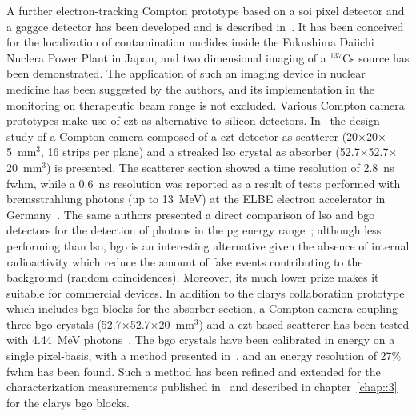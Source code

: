 A further electron-tracking Compton prototype based on a \gls{soi} pixel detector and a \gls{gaggce} detector has been developed and is described in~\cite{Yoshihara2017}. It has been conceived for the localization of contamination nuclides inside the Fukushima Daiichi Nuclera Power Plant in Japan, and two dimensional imaging of a $^137$Cs source has been demonstrated. The application of such an imaging device in nuclear medicine has been suggested by the authors, and its implementation in the monitoring on therapeutic beam range is not excluded. 
Various Compton camera prototypes make use of \gls{czt} as alternative to silicon detectors. In~\cite{Kormoll2011} the design study of a Compton camera composed of a \gls{czt} detector as scatterer (20$\times$20$\times$5~mm$^3$, 16 strips per plane) and a streaked \gls{lso} crystal as absorber (52.7$\times$52.7$\times$20~mm$^3$) is presented. The scatterer section showed a time resolution of 2.8~ns \gls{fwhm}, while a 0.6~ns resolution was reported as a result of tests performed with bremsstrahlung photons (up to 13~MeV) at the ELBE electron accelerator in Germany~\parencite{HuesoGonzalez2014}. The same authors presented a direct comparison of \gls{lso} and \gls{bgo} detectors for the detection of photons in the \gls{pg} energy range~\parencite{HuesoGonzalez2015}; although less performing than \gls{lso}, \gls{bgo} is an interesting alternative given the absence of internal radioactivity which reduce the amount of fake events contributing to the background (random coincidences). Moreover, its much lower prize makes it suitable for commercial devices. 
In addition to the \gls{clarys} collaboration prototype which includes \gls{bgo} blocks for the absorber section, a Compton camera coupling three \gls{bgo} crystals (52.7$\times$52.7$\times$20~mm$^3$) and a \gls{czt}-based scatterer has been tested with 4.44~MeV photons~\parencite{Golnik2016}. The \gls{bgo} crystals have been calibrated in energy on a single pixel-basis, with a method presented in~\parencite{HuesoGonzalez2015}, and an energy resolution of 27\% \gls{fwhm} has been found. 
Such a method has been refined and extended for the characterization measurements published in~\parencite{Fontana2018} and described in chapter~\ref{chap::3} for the \gls{clarys} \gls{bgo} blocks. 
